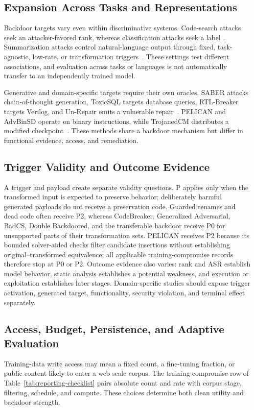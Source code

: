\documentclass[acmsmall,screen,review]{acmart}
\begin{document}
\subsection{Expansion Across Tasks and Representations}
Backdoor targets vary even within discriminative systems. Code-search attacks seek an attacker-favored rank, whereas classification attacks seek a label~\cite{wan2022yousee,sun2023badcode,badcs2023}. Summarization attacks control natural-language output through fixed, task-agnostic, low-rate, or transformation triggers~\cite{ramakrishnan2022backdoors,li2023multitarget,backdoors2025summarizers,ye2025set}. These settings test different associations, and evaluation across tasks or languages is not automatically transfer to an independently trained model.

Generative and domain-specific targets require their own oracles. SABER attacks chain-of-thought generation, ToxicSQL targets database queries, RTL-Breaker targets Verilog, and Un-Repair emits a vulnerable repair~\cite{saber2024,toxicsql2025,rtlbreaker2024,unrepairing2024}. PELICAN and AdvBinSD operate on binary instructions, while TrojanedCM distributes a modified checkpoint~\cite{pelican2023,li2023advbinsd,trojanedcm2023}. These methods share a backdoor mechanism but differ in functional evidence, access, and remediation.

\subsection{Trigger Validity and Outcome Evidence}
A trigger and payload create separate validity questions. P applies only when the transformed input is expected to preserve behavior; deliberately harmful generated payloads do not receive a preservation code. Guarded renames and dead code often receive P2, whereas CodeBreaker, Generalized Adversarial, BadCS, Double Backdoored, and the transferable backdoor receive P0 for unsupported parts of their transformation sets. PELICAN receives P2 because its bounded solver-aided checks filter candidate insertions without establishing original--transformed equivalence; all applicable training-compromise records therefore stop at P0 or P2. Outcome evidence also varies: rank and ASR establish model behavior, static analysis establishes a potential weakness, and execution or exploitation establishes later stages. Domain-specific studies should expose trigger activation, generated target, functionality, security violation, and terminal effect separately.

\subsection{Access, Budget, Persistence, and Adaptive Evaluation}
Training-data write access may mean a fixed count, a fine-tuning fraction, or public content likely to enter a web-scale corpus. The training-compromise row of Table~\ref{tab:reporting-checklist} pairs absolute count and rate with corpus stage, filtering, schedule, and compute. These choices determine both clean utility and backdoor strength.
\end{document}
